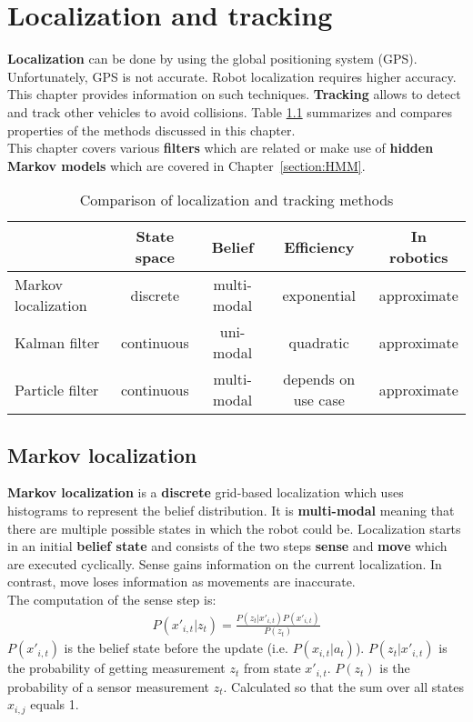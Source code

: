 \documentclass{report}
\begin{document}
\chapter{Localization and tracking}
\label{chapter:localizationandtracking}
{\bf Localization} can be done by using the global positioning system (GPS). Unfortunately, GPS is not accurate. Robot localization requires higher accuracy. This chapter provides information on such techniques.
{\bf Tracking} allows to detect and track other vehicles to avoid collisions.
Table \ref{ref:complocalization} summarizes and compares properties of the methods discussed in this chapter. \\
This chapter covers various {\bf filters} which are related or make use of {\bf hidden Markov models} which are covered in Chapter~\ref{section:HMM}.
\begin{table}[h!]
\begin{center}
\begin{tabular}{l||c|c|c|c}
 & State space & Belief & Efficiency & In robotics \\
\hline
\hline
Markov localization & discrete & multi-modal & exponential & approximate \\
\hline
Kalman filter & continuous & uni-modal & quadratic & approximate \\
\hline
Particle filter & continuous & multi-modal & depends on use case & approximate \\

\end{tabular}
\end{center}
\caption{Comparison of localization and tracking methods}
\label{ref:complocalization}
\end{table}


\section{Markov localization}
{\bf Markov localization} is a {\bf discrete} grid-based localization which uses histograms to represent the belief distribution. It is {\bf multi-modal} meaning that there are multiple possible states in which the robot could be. Localization starts in an initial {\bf belief state} and consists of the two steps {\bf sense} and {\bf move} which are executed cyclically. Sense gains information on the current localization. In contrast, move loses information as movements are inaccurate. \\
The computation of the sense step is: \\
\begin{align*}
P(x'_{i,t}\vert z_t) = \frac{P(z_t\vert x'_{i,t})P(x'_{i,t})}{P(z_t)}
\end{align*}
$P(x'_{i,t})$ is the belief state before the update (i.e. $P(x_{i,t}\vert a_t)$). $P(z_t\vert x'_{i,t})$ is the probability of getting measurement $z_t$ from state $x'_{i,t}$. $P(z_t)$ is the probability of a sensor measurement $z_t$. Calculated so that the sum over all states $x_{i,j}$ equals 1.
\end{document}
